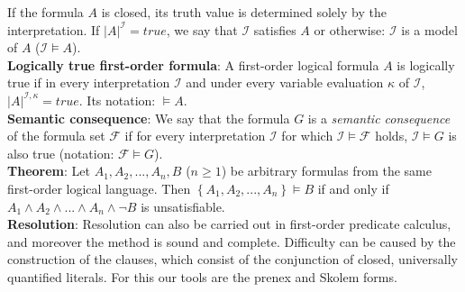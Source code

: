 \documentclass[margin=0px]{article}
\begin{document}
If the formula $A$ is closed, its truth value is determined solely by the interpretation. If $|A|^{\mathcal{I}} = true$,
we say that $\mathcal{I}$ satisfies $A$ or otherwise: $\mathcal{I}$ is a model of $A$ ($\mathcal{I} \models A$).\\

\noindent \textbf{Logically true first-order formula}: A first-order logical formula $A$ is logically true
if in every interpretation $\mathcal{I}$ and under every variable evaluation $\kappa$ of $\mathcal{I}$,
$|A|^{\mathcal{I},\kappa} = true$. Its notation: $\models A$.\\

\noindent \textbf{Semantic consequence}: We say that the formula $G$ is a \textit{semantic consequence} of the
formula set $\mathcal{F}$ if for every interpretation $\mathcal{I}$ for which $\mathcal{I} \models \mathcal{F}$
holds, $\mathcal{I} \models G$ is also true (notation: $\mathcal{F} \models G$).\\

\noindent \textbf{Theorem}: Let $A_{1}, A_{2}, ..., A_{n}, B$ ($n \geq 1$) be arbitrary formulas from the same first-order logical language.
Then $\left\{A_{1}, A_{2}, ..., A_{n}\right\} \models B$ if and only if
$A_{1} \wedge A_{2} \wedge ... \wedge A_{n} \wedge \neg B$ is unsatisfiable.\\

\noindent \textbf{Resolution}: Resolution can also be carried out in first-order predicate calculus, and moreover the method
is sound and complete. Difficulty can be caused by the construction of the clauses, which consist of the conjunction of closed,
universally quantified literals. For this our tools are the
prenex and Skolem forms.
\end{document}
